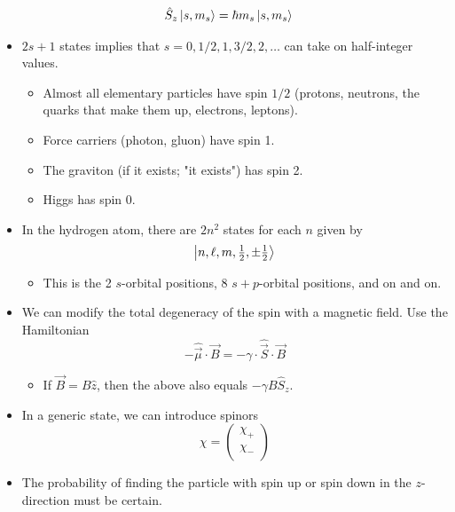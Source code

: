 \documentclass[../notes.tex]{subfiles}
\begin{document}
\begin{itemize}
\begin{align*}
        \hat{S}_z\ket{s,m_s} &= \hbar m_s\ket{s,m_s}
    \end{align*}
    \item $2s+1$ states implies that $s=0,1/2,1,3/2,2,\dots$ can take on half-integer values.
    \begin{itemize}
        \item Almost all elementary particles have spin $1/2$ (protons, neutrons, the quarks that make them up, electrons, leptons).
        \item Force carriers (photon, gluon) have spin 1.
        \item The graviton (if it exists; "it exists") has spin 2.
        \item Higgs has spin 0.
    \end{itemize}
    \item In the hydrogen atom, there are $2n^2$ states for each $n$ given by
    \begin{equation*}
        \ket{n,\ell,m,\tfrac{1}{2},\pm\tfrac{1}{2}}
    \end{equation*}
    \begin{itemize}
        \item This is the 2 $s$-orbital positions, 8 $s+p$-orbital positions, and on and on.
    \end{itemize}
    \item We can modify the total degeneracy of the spin with a magnetic field. Use the Hamiltonian
    \begin{equation*}
        -\hat{\vec{\mu}}\cdot\vec{B} = -\gamma\cdot\hat{\vec{S}}\cdot\vec{B}
    \end{equation*}
    \begin{itemize}
        \item If $\vec{B}=B\hat{z}$, then the above also equals $-\gamma B\hat{S}_z$.
    \end{itemize}
    \item In a generic state, we can introduce spinors
    \begin{equation*}
        \chi =
        \begin{pmatrix}
            \chi_+\\
            \chi_-\\
        \end{pmatrix}
    \end{equation*}
    \item The probability of finding the particle with spin up or spin down in the $z$-direction must be certain.
    \begin{equation*}

\end{equation*}
\end{itemize}
\end{document}
